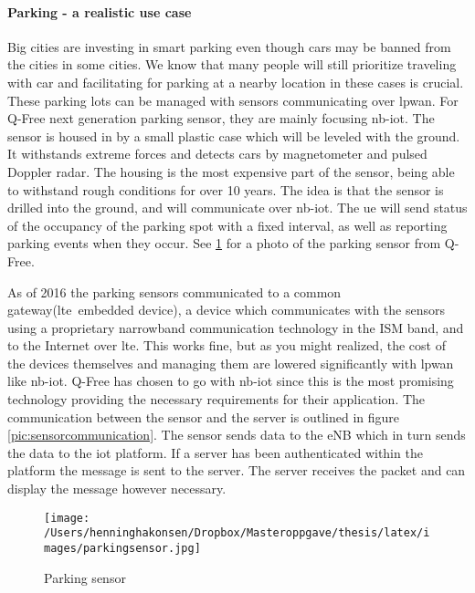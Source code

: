 \documentclass[USenglish]{ifimaster}  %
\begin{document}
\paragraph{Parking - a realistic use case} \label{paragraph:sensoroutline}
Big cities are investing in smart parking even though cars may be banned from the cities in some cities. We know that many people will still prioritize traveling with car and facilitating for parking at a nearby location in these cases is crucial. These parking lots can be managed with sensors communicating over \acrshort{lpwan}. For Q-Free next generation parking sensor, they are mainly focusing \acrshort{nb-iot}. The sensor is housed in by a small plastic case which will be leveled with the ground. It withstands extreme forces and detects cars by magnetometer and pulsed Doppler radar. The housing is the most expensive part of the sensor, being able to withstand rough conditions for over 10 years. The idea is that the sensor is drilled into the ground, and will communicate over \acrshort{nb-iot}. The \acrshort{ue} will send status of the occupancy of the parking spot with a fixed interval, as well as reporting parking events when they occur. See \ref{pic:parkingsensor} for a photo of the parking sensor from Q-Free.

As of 2016 the parking sensors communicated to a common gateway(\acrshort{lte} embedded device), a device which communicates with the sensors using a proprietary narrowband communication technology in the ISM band, and to the Internet over \acrshort{lte}. This works fine, but as you might realized, the cost of the devices themselves and managing them are lowered significantly with \acrshort{lpwan} like \acrshort{nb-iot}. Q-Free has chosen to go with \acrshort{nb-iot} since this is the most promising technology providing the necessary requirements for their application. The communication between the sensor and the server is outlined in figure \vref{pic:sensorcommunication}. The sensor sends data to the eNB which in turn sends the data to the \acrshort{iot} platform. If a server has been authenticated within the platform the message is sent to the server. The server receives the packet and can display the message however necessary.

\begin{figure}[H]
  \centering\texttt{[image: /Users/henninghakonsen/Dropbox/Masteroppgave/thesis/latex/images/parkingsensor.jpg]}
  \caption{Parking sensor  \cite{person:ola}}
  \label{pic:parkingsensor}
\end{figure}
\end{document}
